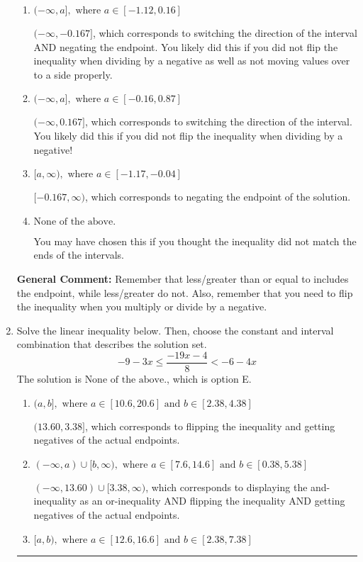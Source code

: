 \documentclass{extbook}[14pt]
\newcommand{\litem}[1]{\item #1

\rule{\textwidth}{0.4pt}}
\begin{document}
\begin{enumerate}
{\begin{enumerate}[label=\Alph*.]
* $[0.167, \infty)$, which is the correct option.
\item \( (-\infty, a], \text{ where } a \in [-1.12, 0.16] \)

 $(-\infty, -0.167]$, which corresponds to switching the direction of the interval AND negating the endpoint. You likely did this if you did not flip the inequality when dividing by a negative as well as not moving values over to a side properly.
\item \( (-\infty, a], \text{ where } a \in [-0.16, 0.87] \)

 $(-\infty, 0.167]$, which corresponds to switching the direction of the interval. You likely did this if you did not flip the inequality when dividing by a negative!
\item \( [a, \infty), \text{ where } a \in [-1.17, -0.04] \)

 $[-0.167, \infty)$, which corresponds to negating the endpoint of the solution.
\item \( \text{None of the above}. \)

You may have chosen this if you thought the inequality did not match the ends of the intervals.
\end{enumerate}

\textbf{General Comment:} Remember that less/greater than or equal to includes the endpoint, while less/greater do not. Also, remember that you need to flip the inequality when you multiply or divide by a negative.
}
\litem{
Solve the linear inequality below. Then, choose the constant and interval combination that describes the solution set.
\[ -9 - 3 x \leq \frac{-19 x - 4}{8} < -6 - 4 x \]
The solution is \( \text{None of the above.} \), which is option E.\begin{enumerate}[label=\Alph*.]
\item \( (a, b], \text{ where } a \in [10.6, 20.6] \text{ and } b \in [2.38, 4.38] \)

$(13.60, 3.38]$, which corresponds to flipping the inequality and getting negatives of the actual endpoints.
\item \( (-\infty, a) \cup [b, \infty), \text{ where } a \in [7.6, 14.6] \text{ and } b \in [0.38, 5.38] \)

$(-\infty, 13.60) \cup [3.38, \infty)$, which corresponds to displaying the and-inequality as an or-inequality AND flipping the inequality AND getting negatives of the actual endpoints.
\item \( [a, b), \text{ where } a \in [12.6, 16.6] \text{ and } b \in [2.38, 7.38] \)


\end{enumerate}}
\end{enumerate}
\end{document}
